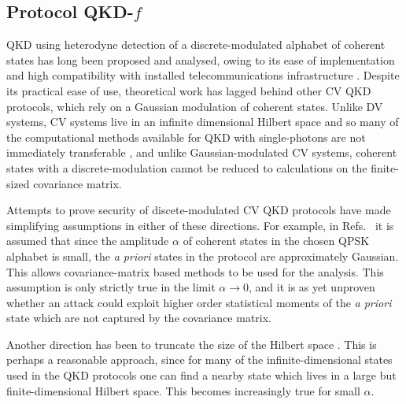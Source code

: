 \subsection{Protocol QKD-$f$}
QKD using heterodyne detection of a discrete-modulated alphabet of coherent states has long been proposed and analysed, owing to its ease of implementation and high compatibility with installed telecommunications infrastructure \cite{Leverrier2011, Papanastasiou2018, Zhao2009, Bradler2018, Ghorai2019, Lin2019}. Despite its practical ease of use, theoretical work has lagged behind other CV QKD protocols, which rely on a Gaussian modulation of coherent states. Unlike DV systems, CV systems live in an infinite dimensional Hilbert space and so many of the computational methods available for QKD with single-photons are not immediately transferable \cite{Tomamichel2012a}, and unlike Gaussian-modulated CV systems, coherent states with a discrete-modulation cannot be reduced to calculations on the finite-sized covariance matrix.  %

Attempts to prove security of discete-modulated CV QKD protocols have made simplifying assumptions in either of these directions. For example, in Refs.~\cite{Leverrier2011, Ghorai2019, Lin2019} it is assumed that since the amplitude $\alpha$ of coherent states in the chosen QPSK alphabet is small, the \emph{a priori} states in the protocol are approximately Gaussian. This allows covariance-matrix based methods to be used for the analysis. This assumption is only strictly true in the limit $\alpha \rightarrow 0$, and it is as yet unproven whether an attack could exploit higher order statistical moments of the \emph{a priori} state which are not captured by the covariance matrix.


Another direction has been to truncate the size of the Hilbert space \cite{Ghorai2019, Lin2019, Papanastasiou2018}. This is perhaps a reasonable approach, since for many of the infinite-dimensional states used in the QKD protocols one can find a nearby state which lives in a large but finite-dimensional Hilbert space. This becomes increasingly true for small $\alpha$. 

